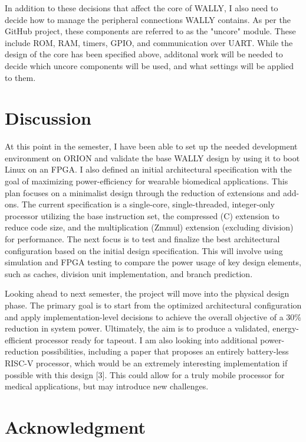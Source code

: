 \documentclass[conference]{IEEEtran}
\begin{document}
In addition to these decisions that affect the core of WALLY, I also need to decide how to manage the peripheral connections WALLY contains. As per the GitHub project, these components are referred to as the "uncore" module. These include ROM, RAM, timers, GPIO, and communication over UART. While the design of the core has been specified above, additonal work will be needed to decide which uncore components will be used, and what settings will be applied to them.

\section{Discussion}
At this point in the semester, I have been able to set up the needed development environment on ORION and validate the base WALLY design by using it to boot Linux on an FPGA. I also defined an initial architectural specification with the goal of maximizing power-efficiency for wearable biomedical applications. This plan focuses on a minimalist design through the reduction of extensions and add-ons. The current specification is a single-core, single-threaded, integer-only processor utilizing the base instruction set, the compressed (C) extension to reduce code size, and the multiplication (Zmmul) extension (excluding division) for performance. The next focus is to test and finalize the best architectural configuration based on the initial design specification. This will involve using simulation and FPGA testing to compare the power usage of key design elements, such as caches, division unit implementation, and branch prediction.

Looking ahead to next semester, the project will move into the physical design phase. The primary goal is to start from the optimized architectural configuration and apply implementation-level decisions to achieve the overall objective of a 30\% reduction in system power. Ultimately, the aim is to produce a validated, energy-efficient processor ready for tapeout. I am also looking into additional power-reduction possibilities, including a paper that proposes an entirely battery-less RISC-V processor, which would be an extremely interesting implementation if possible with this design [3]. This could allow for a truly mobile processor for medical applications, but may introduce new challenges.

\section*{Acknowledgment}
\end{document}
